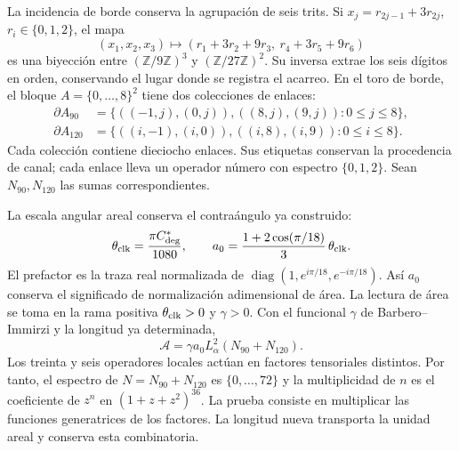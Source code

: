 La incidencia de borde conserva la agrupación de seis trits.
Si $x_j=r_{2j-1}+3r_{2j}$, $r_i\in\{0,1,2\}$, el mapa
\[
 (x_1,x_2,x_3)\longmapsto
 (r_1+3r_2+9r_3,\ r_4+3r_5+9r_6)
\]
es una biyección entre $(\mathbb Z/9\mathbb Z)^3$ y
$(\mathbb Z/27\mathbb Z)^2$. Su inversa extrae los seis dígitos en orden,
conservando el lugar donde se registra el acarreo. En el toro de borde,
el bloque $A=\{0,\ldots,8\}^2$ tiene dos colecciones de enlaces:
\begin{align*}
 \partial A_{90}&=\{((-1,j),(0,j)),((8,j),(9,j)):0\le j\le8\},\\
 \partial A_{120}&=\{((i,-1),(i,0)),((i,8),(i,9)):0\le i\le8\}.
\end{align*}
Cada colección contiene dieciocho enlaces. Sus etiquetas conservan la
procedencia de canal; cada enlace lleva un operador número con espectro
$\{0,1,2\}$. Sean $N_{90},N_{120}$ las sumas correspondientes.

La escala angular areal conserva el contraángulo ya construido:
\[
 \theta_{\rm clk}=\frac{\pi C^*_{\deg}}{1080},\qquad
 a_0=\frac{1+2\cos(\pi/18)}3\,\theta_{\rm clk}.
\]
El prefactor es la traza real normalizada de
$\operatorname{diag}(1,e^{i\pi/18},e^{-i\pi/18})$.
Así $a_0$ conserva el significado de normalización adimensional de área.
La lectura de área se toma en la rama positiva
$\theta_{\rm clk}>0$ y $\gamma>0$.
Con el funcional $\gamma$ de Barbero--Immirzi y la longitud ya determinada,
\[
 \mathcal A=\gamma a_0L_\alpha^2(N_{90}+N_{120}).
\]
Los treinta y seis operadores locales actúan en factores tensoriales
distintos. Por tanto, el espectro de $N=N_{90}+N_{120}$ es
$\{0,\ldots,72\}$ y la multiplicidad de $n$ es el coeficiente de $z^n$
en $(1+z+z^2)^{36}$. La prueba consiste en multiplicar las funciones
generatrices de los factores. La longitud nueva transporta la unidad
areal y conserva esta combinatoria.

